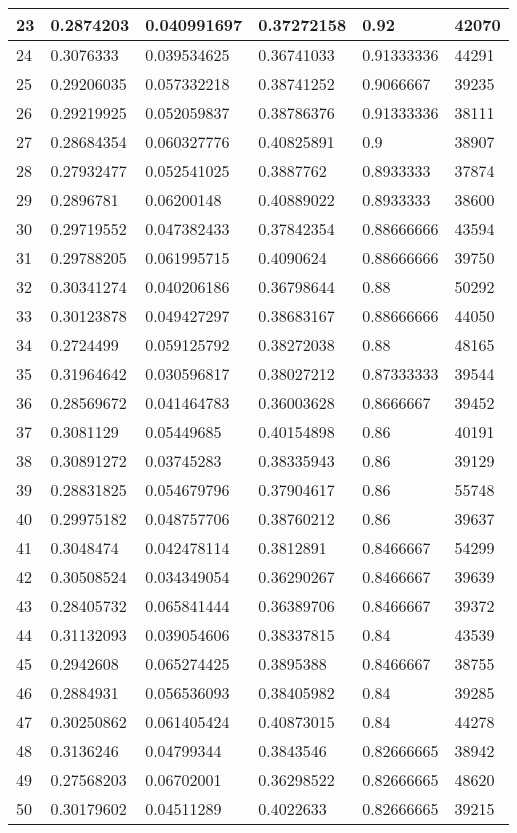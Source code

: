 \begin{longtable}{|l|l|l|l|l|l|}
23 & 0.2874203 & 0.040991697 & 0.37272158 & 0.92 & 42070 \\ \hline 
24 & 0.3076333 & 0.039534625 & 0.36741033 & 0.91333336 & 44291 \\ \hline 
25 & 0.29206035 & 0.057332218 & 0.38741252 & 0.9066667 & 39235 \\ \hline 
26 & 0.29219925 & 0.052059837 & 0.38786376 & 0.91333336 & 38111 \\ \hline 
27 & 0.28684354 & 0.060327776 & 0.40825891 & 0.9 & 38907 \\ \hline 
28 & 0.27932477 & 0.052541025 & 0.3887762 & 0.8933333 & 37874 \\ \hline 
29 & 0.2896781 & 0.06200148 & 0.40889022 & 0.8933333 & 38600 \\ \hline 
30 & 0.29719552 & 0.047382433 & 0.37842354 & 0.88666666 & 43594 \\ \hline 
31 & 0.29788205 & 0.061995715 & 0.4090624 & 0.88666666 & 39750 \\ \hline 
32 & 0.30341274 & 0.040206186 & 0.36798644 & 0.88 & 50292 \\ \hline 
33 & 0.30123878 & 0.049427297 & 0.38683167 & 0.88666666 & 44050 \\ \hline 
34 & 0.2724499 & 0.059125792 & 0.38272038 & 0.88 & 48165 \\ \hline 
35 & 0.31964642 & 0.030596817 & 0.38027212 & 0.87333333 & 39544 \\ \hline 
36 & 0.28569672 & 0.041464783 & 0.36003628 & 0.8666667 & 39452 \\ \hline 
37 & 0.3081129 & 0.05449685 & 0.40154898 & 0.86 & 40191 \\ \hline 
38 & 0.30891272 & 0.03745283 & 0.38335943 & 0.86 & 39129 \\ \hline 
39 & 0.28831825 & 0.054679796 & 0.37904617 & 0.86 & 55748 \\ \hline 
40 & 0.29975182 & 0.048757706 & 0.38760212 & 0.86 & 39637 \\ \hline 
41 & 0.3048474 & 0.042478114 & 0.3812891 & 0.8466667 & 54299 \\ \hline 
42 & 0.30508524 & 0.034349054 & 0.36290267 & 0.8466667 & 39639 \\ \hline 
43 & 0.28405732 & 0.065841444 & 0.36389706 & 0.8466667 & 39372 \\ \hline 
44 & 0.31132093 & 0.039054606 & 0.38337815 & 0.84 & 43539 \\ \hline 
45 & 0.2942608 & 0.065274425 & 0.3895388 & 0.8466667 & 38755 \\ \hline 
46 & 0.2884931 & 0.056536093 & 0.38405982 & 0.84 & 39285 \\ \hline 
47 & 0.30250862 & 0.061405424 & 0.40873015 & 0.84 & 44278 \\ \hline 
48 & 0.3136246 & 0.04799344 & 0.3843546 & 0.82666665 & 38942 \\ \hline 
49 & 0.27568203 & 0.06702001 & 0.36298522 & 0.82666665 & 48620 \\ \hline 
50 & 0.30179602 & 0.04511289 & 0.4022633 & 0.82666665 & 39215 \\ \hline 
\end{longtable}